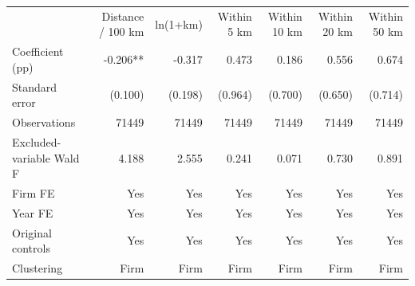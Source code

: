 \begin{tabular}{lrrrrrr}
\hline
 & Distance / 100 km & ln(1+km) & Within 5 km & Within 10 km & Within 20 km & Within 50 km \\
Coefficient (pp) & -0.206** & -0.317 & 0.473 & 0.186 & 0.556 & 0.674 \\
Standard error & (0.100) & (0.198) & (0.964) & (0.700) & (0.650) & (0.714) \\
Observations & 71449 & 71449 & 71449 & 71449 & 71449 & 71449 \\
Excluded-variable Wald F & 4.188 & 2.555 & 0.241 & 0.071 & 0.730 & 0.891 \\
Firm FE & Yes & Yes & Yes & Yes & Yes & Yes \\
Year FE & Yes & Yes & Yes & Yes & Yes & Yes \\
Original controls & Yes & Yes & Yes & Yes & Yes & Yes \\
Clustering & Firm & Firm & Firm & Firm & Firm & Firm \\
\hline
\end{tabular}
